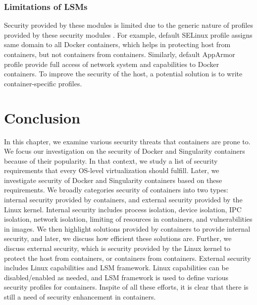 \subsubsection{Limitations of LSMs}

Security provided by these modules is limited due to
the generic nature of profiles provided by these security
modules \cite{martin2018docker}. For example, default
SELinux profile assigns same domain to all Docker
containers, which helps in protecting host from containers,
but not containers from containers. Similarly, default
AppArmor profile provide full access of network system and
capabilities to Docker containers.
To improve the security of the host, a potential solution is to write
container-specific profiles.


\section{Conclusion}

In this chapter, we examine various security threats that
containers are prone to. We focus our investigation on the
security of Docker and Singularity containers because of their popularity.
In that context, we study a list of security requirements that every OS-level
virtualization should fulfill. Later, we investigate security of Docker and Singularity
containers based on these requirements. We broadly categories security of
containers into two types: internal security provided by containers, and
external security provided by the Linux kernel.
Internal security includes process isolation, device isolation, IPC
isolation, network isolation, limiting of resources in containers, and
vulnerabilities in images.
We then highlight solutions
provided by containers to provide internal security, and later,
we discuss how efficient these solutions are.
Further, we discuss external security, which is security provided by
the Linux kernel to protect the host from containers, or containers from
containers. External security includes Linux
capabilities and LSM framework. Linux capabilities can be
disabled/enabled as needed, and LSM framework is used
to define various security profiles for containers.
Inspite of all these efforts, it is clear that there is
still a need of security enhancement in containers.
